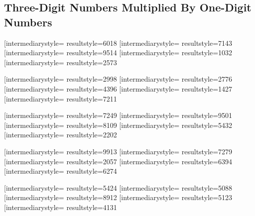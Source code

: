 \documentclass[letterpaper, 17pt]{article}
\newcommand{\white}[1]{}
\begin{document}
\begin{center}
	\section*{Three-Digit Numbers Multiplied By One-Digit Numbers}

	\vspace{0.3in}

	\opmul[intermediarystyle=\white, resultstyle=\white]{601}{8}\qquad
	\opmul[intermediarystyle=\white, resultstyle=\white]{714}{3}\qquad
	\opmul[intermediarystyle=\white, resultstyle=\white]{951}{4}\qquad
	\opmul[intermediarystyle=\white, resultstyle=\white]{103}{2}\qquad
	\opmul[intermediarystyle=\white, resultstyle=\white]{257}{3}\qquad

	\vspace{0.5in}

	\opmul[intermediarystyle=\white, resultstyle=\white]{299}{8}\qquad
	\opmul[intermediarystyle=\white, resultstyle=\white]{277}{6}\qquad
	\opmul[intermediarystyle=\white, resultstyle=\white]{439}{6}\qquad
	\opmul[intermediarystyle=\white, resultstyle=\white]{142}{7}\qquad
	\opmul[intermediarystyle=\white, resultstyle=\white]{721}{1}\qquad

	\vspace{0.5in}

	\opmul[intermediarystyle=\white, resultstyle=\white]{724}{9}\qquad
	\opmul[intermediarystyle=\white, resultstyle=\white]{950}{1}\qquad
	\opmul[intermediarystyle=\white, resultstyle=\white]{810}{9}\qquad
	\opmul[intermediarystyle=\white, resultstyle=\white]{543}{2}\qquad
	\opmul[intermediarystyle=\white, resultstyle=\white]{220}{2}\qquad

	\vspace{0.5in}

	\opmul[intermediarystyle=\white, resultstyle=\white]{991}{3}\qquad
	\opmul[intermediarystyle=\white, resultstyle=\white]{727}{9}\qquad
	\opmul[intermediarystyle=\white, resultstyle=\white]{205}{7}\qquad
	\opmul[intermediarystyle=\white, resultstyle=\white]{639}{4}\qquad
	\opmul[intermediarystyle=\white, resultstyle=\white]{627}{4}\qquad

	\vspace{0.5in}

	\opmul[intermediarystyle=\white, resultstyle=\white]{542}{4}\qquad
	\opmul[intermediarystyle=\white, resultstyle=\white]{508}{8}\qquad
	\opmul[intermediarystyle=\white, resultstyle=\white]{891}{2}\qquad
	\opmul[intermediarystyle=\white, resultstyle=\white]{512}{3}\qquad
	\opmul[intermediarystyle=\white, resultstyle=\white]{413}{1}\qquad
\end{center}
\end{document}
